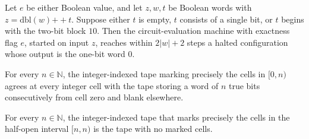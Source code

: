 \begin{theorem}
\label{BoolCircuit.CircuitEval.bad_run}
\leanok
{}
Let $e$ be either Boolean value, and let $z,w,t$ be Boolean words with
$z=\mathrm{dbl}(w)\mathbin{++}t$. Suppose either $t$ is empty, $t$ consists of a single
bit, or $t$ begins with the two-bit block $10$. Then the circuit-evaluation machine with
exactness flag $e$, started on input $z$, reaches within $2|w|+2$ steps a halted
configuration whose output is the one-bit word $0$.
\end{theorem}

\begin{theorem}
\label{BoolCircuit.CircuitEval.onesFrom_zero}
\leanok
{}
For every $n\in\mathbb N$, the integer-indexed tape marking precisely the cells in
$[0,n)$ agrees at every integer cell with the tape storing a word of $n$ true bits
consecutively from cell zero and blank elsewhere.
\end{theorem}

\begin{theorem}
\label{BoolCircuit.CircuitEval.onesFrom_self}
\leanok
{}
For every $n\in\mathbb N$, the integer-indexed tape that marks precisely the cells in
the half-open interval $[n,n)$ is the tape with no marked cells.
\end{theorem}

